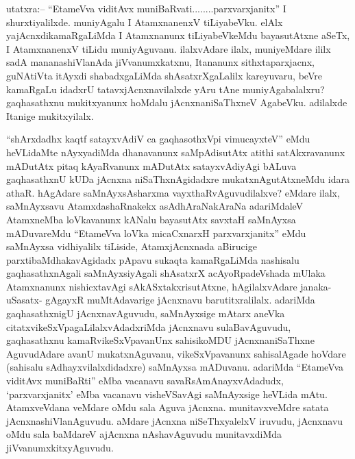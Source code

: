 
\begin{artha}
utatxra:{\rm --} ``EtameVva viditAvx muniBaRvati........parxvarxjanitx'' I shurxtiyalilxde. muniyAgalu I AtamxnanenxV tiLiyabeVku. elAlx yajAcnxdikamaRgaLiMda I Atamxnanunx tiLiyabeVkeMdu bayasutAtxne aSeTx, I AtamxnanenxV tiLidu muniyAguvanu. ilalxvAdare ilalx, muniyeMdare ililx sadA mananashiVlanAda jiVvanumxkatxnu, Itananunx sithxtaparxjacnx, guNAtiVta itAyxdi shabadxgaLiMda shAsatxrXgaLalilx kareyuvaru, beVre kamaRgaLu idadxrU tatavxjAcnxnavilalxde yAru tAne muniyAgabalalxru? gaqhasathxnu mukitxyanunx hoMdalu jAcnxnaniSaThxneV AgabeVku. adilalxde Itanige mukitxyilalx.
\end{artha}


\begin{artha}
``shArxdadhx kaqtf satayxvAdiV ca gaqhasothxV\s pi vimucayxteV'' eMdu heVLidaMte nAyxyadiMda dhanavanunx saMpAdisutAtx atithi satAkxravanunx mADutAtx pitaq kAyaRvanunx mADutAtx satayxvAdiyAgi bALuva gaqhasathxnU kUDa jAcnxna niSaThxnAgidadxre mukatxnAgutAtxneMdu idara athaR. hAgAdare saMnAyxsAsharxma vayxthaRvAguvudilalxve? eMdare ilalx, saMnAyxsavu AtamxdashaRnakekx asAdhAraNakAraNa adariMdaleV AtamxneMba loVkavanunx kANalu bayasutAtx savxtaH saMnAyxsa mADuvareMdu ``EtameVva loVka micaCxnarxH parxvarxjanitx'' eMdu saMnAyxsa vidhiyalilx tiLiside, AtamxjAcnxnada aBirucige parxtibaMdhakavAgidadx pApavu sukaqta kamaRgaLiMda nashisalu gaqhasathxnAgali saMnAyxsiyAgali shAsatxrX acAyoRpadeVshada mUlaka Atamxnanunx nishicxtavAgi sAkASxtakxrisutAtxne, hAgilalxvAdare janaka- uSasatx- gAgayxR muMtAdavarige jAcnxnavu barutitxralilalx. adariMda gaqhasathxnigU jAcnxnavAguvudu, saMnAyxsige mAtarx aneVka citatxvikeSxVpagaLilalxvAdadxriMda jAcnxnavu sulaBavAguvudu, gaqhasathxnu kamaRvikeSxVpavanUnx sahisikoMDU jAcnxnaniSaThxne AguvudAdare avanU mukatxnAguvanu, vikeSxVpavanunx sahisalAgade hoVdare (sahisalu sAdhayxvilalxdidadxre) saMnAyxsa mADuvanu. adariMda ``EtameVva viditAvx muniBaRti'' eMba vacanavu savaRsAmAnayxvAdadudx, `parxvarxjanitx' eMba vacanavu visheVSavAgi saMnAyxsige heVLida mAtu. AtamxveVdana veMdare oMdu sala Aguva jAcnxna. munitavxveMdre satata jAcnxnashiVlanAguvudu. aMdare jAcnxna niSeThxyalelxV iruvudu, jAcnxnavu oMdu sala baMdareV ajAcnxna nAshavAguvudu munitavxdiMda jiVvanumxkitxyAguvudu.
\end{artha}

